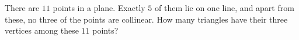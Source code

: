There are $11$ points in a plane. Exactly $5$ of them lie on one line, and apart from these, no three of the points are collinear. How many triangles have their three vertices among these $11$ points?
